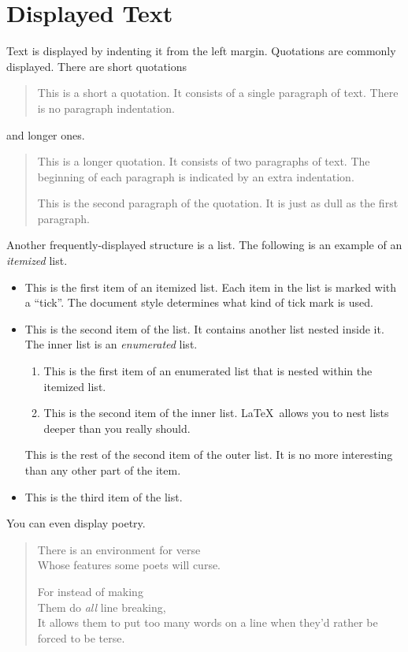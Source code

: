\section{Displayed Text}

Text is displayed by indenting it from the left margin.
Quotations are commonly displayed.  There are short quotations
\begin{quote}
   This is a short a quotation.  It consists of a 
   single paragraph of text.  There is no paragraph
   indentation.
\end{quote}
and longer ones.
\begin{quotation}
   This is a longer quotation.  It consists of two paragraphs
   of text.  The beginning of each paragraph is indicated
   by an extra indentation.

   This is the second paragraph of the quotation.  It is just
   as dull as the first paragraph.
\end{quotation}
Another frequently-displayed structure is a list.
The following is an example of an {\em itemized} list.
\begin{itemize}
   \item  This is the first item of an itemized list.  Each item 
          in the list is marked with a ``tick''.  The document
          style determines what kind of tick mark is used.

   \item  This is the second item of the list.  It contains another
          list nested inside it.  The inner list is an {\em enumerated}
          list.
          \begin{enumerate}
              \item This is the first item of an enumerated list that
                    is nested within the itemized list.

              \item This is the second item of the inner list.  \LaTeX\
                    allows you to nest lists deeper than you really should.
          \end{enumerate}
          This is the rest of the second item of the outer list.  It
          is no more interesting than any other part of the item.
   \item  This is the third item of the list.
\end{itemize}
You can even display poetry.
\begin{verse}
   There is an environment for verse \\    %
   Whose features some poets will curse.   %


   For instead of making\\
   Them do {\em all\/} line breaking, \\
   It allows them to put too many words on a line when they'd 
   rather be forced to be terse.
\end{verse}

